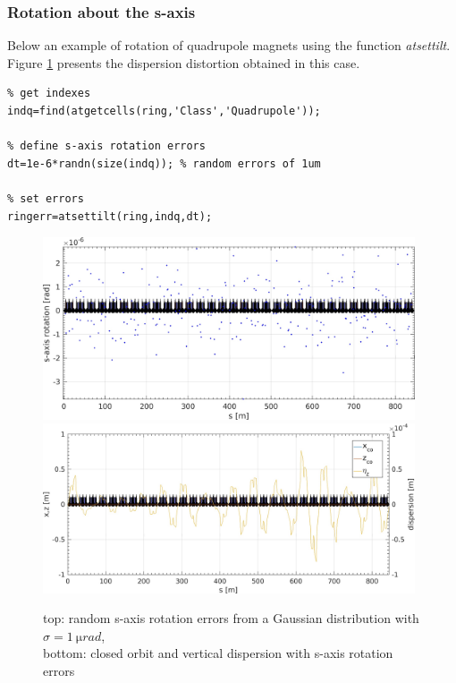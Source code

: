 \clearpage
\subsubsection*{Rotation about the s-axis}
Below an example of rotation of quadrupole magnets using the function \emph{atsettilt}. Figure \ref{fig:rot} presents the dispersion distortion obtained in this case.
 
\begin{lstlisting}
% get indexes
indq=find(atgetcells(ring,'Class','Quadrupole'));

% define s-axis rotation errors
dt=1e-6*randn(size(indq)); % random errors of 1um

% set errors
ringerr=atsettilt(ring,indq,dt);
\end{lstlisting}

\begin{figure}[!h]
	\centering
		\includegraphics[width=0.98\textwidth]{./images/TILT/SetErrTilt.jpg}
	\includegraphics[width=0.98\textwidth]{./images/TILT/OrbitWithErrTilt.jpg}
	\caption{top: random s-axis rotation errors from a Gaussian distribution with $\sigma=\SI{1}{\micro rad}$,\\ bottom: closed orbit and vertical dispersion with s-axis rotation errors}
	\label{fig:rot}
\end{figure}

